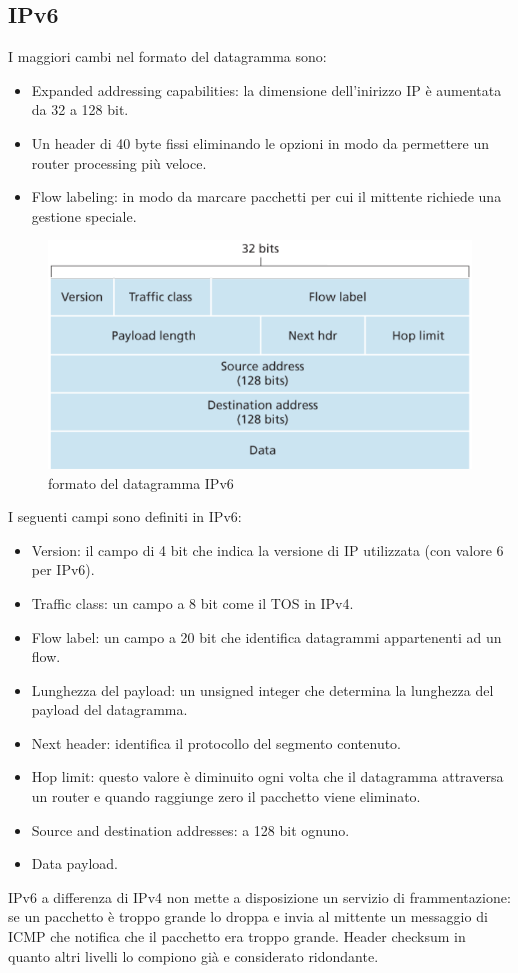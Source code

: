\subsection{IPv6}
I maggiori cambi nel formato del datagramma sono:
\begin{itemize}
\item Expanded addressing capabilities: la dimensione dell'inirizzo IP \`e aumentata da 32 a 128 bit. 
\item Un header di 40 byte fissi eliminando le opzioni in modo da permettere un router processing pi\`u veloce.
\item Flow labeling: in modo da marcare pacchetti per cui il mittente richiede una gestione speciale. 
\end{itemize}
\begin{figure}[h]
\includegraphics[width=\textwidth]{IPv6Datagram.png}
\caption{formato del datagramma IPv6}
\end{figure}
I seguenti campi sono definiti in IPv6:
\begin{itemize}
\item Version: il campo di 4 bit che indica la versione di IP utilizzata (con valore 6 per IPv6).
\item Traffic class: un campo a 8 bit come il TOS in IPv4.
\item Flow label: un campo a 20 bit che identifica datagrammi appartenenti ad un flow.
\item Lunghezza del payload: un unsigned integer che determina la lunghezza del payload del datagramma. 
\item Next header: identifica il protocollo del segmento contenuto.
\item Hop limit: questo valore \`e diminuito ogni volta che il datagramma attraversa un router e quando raggiunge zero il pacchetto viene eliminato.
\item Source and destination addresses: a 128 bit ognuno.
\item Data payload.
\end{itemize}
IPv6 a differenza di IPv4 non mette a disposizione un servizio di frammentazione: se un pacchetto \`e troppo grande lo droppa e invia al mittente un 
messaggio di ICMP che notifica che il pacchetto era troppo grande. Header checksum in quanto altri livelli lo compiono gi\`a e considerato ridondante. 
